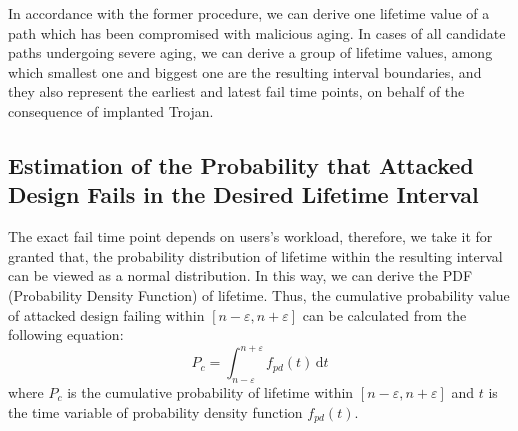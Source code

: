 In accordance with the former procedure, we can derive one lifetime value of a path which has been compromised with malicious aging. In cases of all candidate paths undergoing severe aging, we can derive a group of lifetime values, among which smallest one and biggest one are the resulting interval boundaries, and they also represent the earliest and latest fail time points, on behalf of the consequence of implanted Trojan.

\subsection{Estimation of the Probability that Attacked Design Fails in the Desired Lifetime Interval}
The exact fail time point depends on users's workload, therefore, we take it for granted that, the probability distribution of lifetime within the resulting interval can be viewed as a normal distribution. In this way, we can derive the PDF (Probability Density Function) of lifetime. Thus, the cumulative probability value of attacked design failing within $[n-\varepsilon, n+\varepsilon]$ can be calculated from the following equation:
\begin{equation}
	\label{eq:pdf}
		P_{c} = \int_{n-\varepsilon}^{n+\varepsilon} f_{pd}(t) \,\mathrm{d}t
\end{equation}
where $P_{c}$ is the cumulative probability of lifetime within $[n-\varepsilon, n+\varepsilon]$ and $t$ is the time variable of probability density function $f_{pd}(t)$.

  
